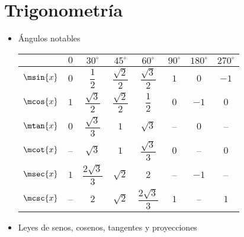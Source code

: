 \section{Trigonometría}
\begin{itemize}
	\item Ángulos notables
	\begin{table}[H]
		\centering
		\begin{tabular}{|c|c|c|c|c|c|c|c|}
			\hline
			& $0$ & $30^{\circ}$ & $45^{\circ}$ & $60^{\circ}$ & $90^{\circ}$ & $180^{\circ}$ & $270^{\circ}$ \\
			\hline
			$\msin{x}$ & $0$ & $\dfrac{1}{2}$ & $\dfrac{\sqrt{2}}{2}$ & $\dfrac{\sqrt{3}}{2}$ & $1$ & $0$ & $-1$ \\
			\hline
			$\mcos{x}$ & $1$ & $\dfrac{\sqrt{3}}{2}$ & $\dfrac{\sqrt{2}}{2}$ & $\dfrac{1}{2}$ & $0$ & $-1$ & $0$ \\
			\hline
			$\mtan{x}$ & $0$ & $\dfrac{\sqrt{3}}{3}$ & $1$ & $\sqrt{3}$ & -- & $0$ & -- \\
			\hline
			$\mcot{x}$ & -- & $\sqrt{3}$ & $1$ & $\dfrac{\sqrt{3}}{3}$ & $0$ & -- & $0$ \\
			\hline
			$\msec{x}$ & $1$ & $\dfrac{2\sqrt{3}}{3}$ & $\sqrt{2}$ & $2$ & -- & $-1$ & -- \\
			\hline
			$\mcsc{x}$ & -- & $2$ & $\sqrt{2}$ & $\dfrac{2\sqrt{3}}{3}$ & $1$ & -- & $1$ \\
			\hline
		\end{tabular}
	\end{table}
	\item Leyes de senos, cosenos, tangentes y proyecciones
	\begin{figure}[H]
		\centering
		\begin{tikzpicture}[x=0.75pt,y=0.75pt,yscale=-1,xscale=1]
			

\end{tikzpicture}
\end{figure}
\end{itemize}
